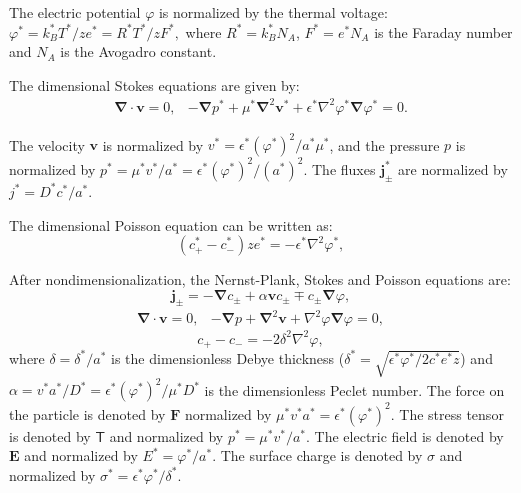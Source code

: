 \documentclass[10pt]{ijnam}
\newcommand\eps \epsilon
\newcommand\Laplacian{\nabla^2}
\newcommand\bnabla{\boldsymbol{\nabla}}
\newcommand\bLaplacian{\boldsymbol{\nabla}^2}
\newcommand\bv{\boldsymbol{v}}
\newcommand\bE{\boldsymbol{E}}
\newcommand\bj{\boldsymbol{j}}
\newcommand\bF{\boldsymbol{F}}
\newcommand\tT{\mathsf{T}}
\begin{document}
The electric potential $\varphi$ is normalized by the thermal voltage:
$\varphi^* = {k_B^* T^*}/{z e^*} = {R^* T^*}/{z F^*},$
where $R^* = k_B^* N_A$, $F^* = e^* N_A$ is the Faraday number and $N_A$ is the Avogadro constant.

The dimensional Stokes equations are given by:
\begin{equation} \begin{array}{cc}
\bnabla \cdot \bv = 0, &
-\bnabla p^* + \mu^* \bLaplacian \bv^* + \eps^* \Laplacian \varphi^* 
\bnabla \varphi^* = 0.
\end{array}\end{equation}

The velocity $\bv$ is normalized by $v^* = {\eps^* (\varphi^*)^2}/{a^* \mu^*}$,
and the pressure $p$ is normalized by $p^* = {\mu^* v^*}/{a^*} = {\eps^* (\varphi^*)^2}/{(a^*)^2}$.
The fluxes $\bj^*_\pm$ are normalized by $j^* = {D^* c^*}/{a^*}$.

The dimensional Poisson equation can be written as:
\begin{equation}
(c^*_+ - c^*_-) z e^* = -\eps^* \Laplacian \varphi^*,
\end{equation}

After nondimensionalization, the Nernst-Plank, Stokes and Poisson equations are:
\begin{equation} \label{eq:nernst}
\bj_\pm = 
-\bnabla c_\pm + \alpha \bv c_\pm \mp c_\pm \bnabla \varphi,
\end{equation}
\begin{equation} \label{eq:stokes}
\begin{array}{cc}
\bnabla \cdot \bv = 0, &
-\bnabla p + \bLaplacian \bv + \Laplacian \varphi \bnabla \varphi = 0, 
\end{array}
\end{equation}
\begin{equation} \label{eq:poisson}
c_+ - c_- = -2\delta^2 \Laplacian \varphi,
\end{equation}
where $\delta = {\delta^*}/{a^*}$ is the dimensionless Debye thickness 
($\delta^* = \sqrt{{\eps^* \varphi^*}/{2 c^* e^* z}}$) and 
$\alpha = {v^* a^*}/{D^*} = {\eps^* (\varphi^*)^2}/{\mu^* D^*}$ 
is the dimensionless Peclet number.
The force on the particle is denoted by $\bF$ normalized by $\mu^* v^* a^* = \eps^* (\varphi^*)^2$.
The stress tensor is denoted by $\tT$ and normalized by $p^* = \mu^* v^* / a^*$.
The electric field is denoted by $\bE$ and normalized by $E^* = \varphi^* / a^*$.
The surface charge is denoted by $\sigma$ and normalized by $\sigma^* = \eps^* \varphi^* / \delta^*$.
\end{document}
